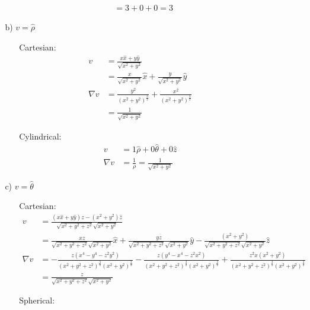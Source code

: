 \documentclass{article}
\begin{document}
\begin{itemize}
\begin{itemize}
\begin{itemize}
\begin{itemize}
\begin{align*}
                    &=3+0+0=3
                \end{align*}
            \end{itemize}
            \newpage
            \item [b)] \(v = \hat{\rho}\)
            \begin{itemize}
                \item [Cartesian:]
                \begin{align*}
                    v&=\frac{x\hat x+y\hat y}{\sqrt{x^2+y^2}}\\
                    &=\frac{x}{\sqrt{x^2+y^2}}\hat x+\frac{y}{\sqrt{x^2+y^2}}\hat y\\
                    \nabla v &= \frac{y^2}{(x^2+y^2)^\frac{3}{2}}+\frac{x^2}{(x^2+y^2)^\frac{3}{2}}\\
                    &=\frac{1}{\sqrt{x^2+y^2}}
                \end{align*}
                \item [Cylindrical:]
                \begin{align*}
                    v&=1\hat\rho+0\hat\theta+0\hat z\\
                    \nabla v &= \frac{1}{\rho}=\frac{1}{\sqrt{x^2+y^2}}
                \end{align*}
            \end{itemize}
            \item [c)] \(v = \hat{\theta}\)
            \begin{itemize}
                \item [Cartesian:]
                \begin{align*}
                    v &= \frac{(x\hat x +y\hat y)z-(x^2+y^2)\hat z}{\sqrt{x^2+y^2+z^2}\sqrt{x^2+y^2}}\\
                    &=\frac{xz}{\sqrt{x^2+y^2+z^2}\sqrt{x^2+y^2}}\hat x+\frac{yz}{\sqrt{x^2+y^2+z^2}\sqrt{x^2+y^2}}\hat y-\frac{(x^2+y^2)}{\sqrt{x^2+y^2+z^2}\sqrt{x^2+y^2}}\hat z\\
                    \nabla v&= -\frac{z(x^4-y^4-z^2y^2)}{(x^2+y^2+z^2)^{\frac{3}{2}}(x^2+y^2)^{\frac{3}{2}}}-\frac{z(y^4-x^4-z^2x^2)}{(x^2+y^2+z^2)^{\frac{3}{2}}(x^2+y^2)^{\frac{3}{2}}}+\frac{z^2x(x^2+y^2)}{(x^2+y^2+z^2)^{\frac{3}{2}}(x^2+y^2)^{\frac{3}{2}}}\\
                    &=\frac{z}{\sqrt{x^2+y^2+z^2}\sqrt{x^2+y^2}}
                \end{align*}
                \item [Spherical:]
                \begin{align*}

\end{align*}
\end{itemize}
\end{itemize}
\end{itemize}
\end{itemize}
\end{document}

